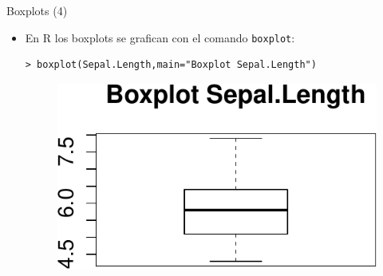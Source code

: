 \documentclass[handout]{beamer}
\begin{document}
\begin{frame}[fragile]{Boxplots (4)}
\scriptsize{
\begin{itemize}
 \item En R los boxplots se grafican con el comando \verb+boxplot+:
 \begin{verbatim}
> boxplot(Sepal.Length,main="Boxplot Sepal.Length")
 \end{verbatim}

 \begin{figure}[h!]
	\centering
	\includegraphics[scale=0.7]{pics/boxplotsimple.pdf}		
\end{figure} 
 
 
\end{itemize}



}
\end{frame}
\end{document}
